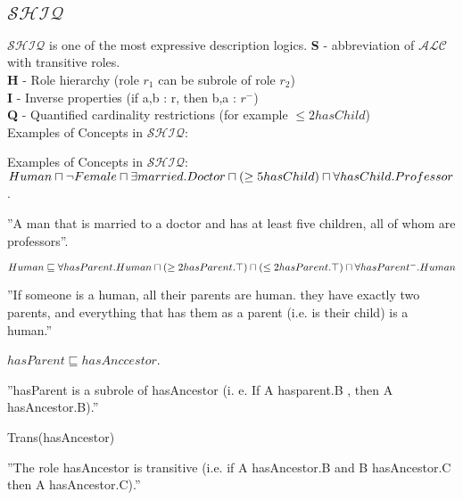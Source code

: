 \subsection{$\mathcal{SHIQ}$} 
\label{SHIQ}
$\mathcal{SHIQ}$ is one of the most expressive description logics.
\textbf{S} - abbreviation of \textbf{$\mathcal{ALC}$} with transitive roles. \\
\textbf{H} - Role hierarchy  (role $r_1$ can be subrole of role $r_2$)\\
\textbf{I} - Inverse properties   (if a,b : r, then b,a : $r^-$) \\
\textbf{Q} - Quantified cardinality restrictions  (for example $\leq 2  hasChild$)\\

Examples of Concepts in \textbf{$\mathcal{SHIQ}$}:
\begin{myex} \cite{handbook}
Examples of Concepts in \textbf{$\mathcal{SHIQ}$}: \\
$ Human  \sqcap \neg Female \sqcap \exists married.Doctor \\
 \sqcap (\geq 5  hasChild) \sqcap \forall hasChild.Professor $ .

''A man that is married to a doctor and has at least five
children, all of whom are professors''.

$Human \sqsubseteq \forall hasParent.Human \sqcap (\geq 2 hasParent.\top) \\
 \sqcap (\leq 2 hasParent.\top) 
\sqcap \forall hasParent^-.Human$

''If someone is a human, all their parents are human. they have exactly two parents, and everything that has them as a parent (i.e. is their child) is a human.''

$hasParent \sqsubseteq hasAnccestor$.

''hasParent is a subrole of hasAncestor (i. e. If A hasparent.B , then A hasAncestor.B).''


Trans(hasAncestor) 

''The role hasAncestor is transitive (i.e. if A hasAncestor.B and B hasAncestor.C then A hasAncestor.C).'' \\
\end{myex}

